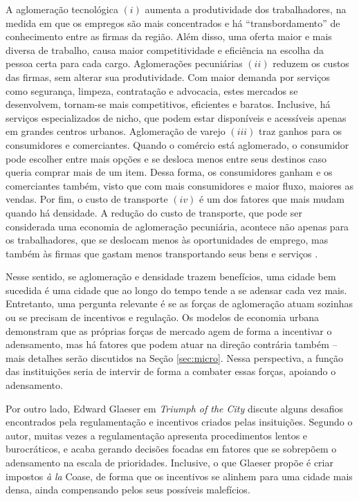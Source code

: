A aglomeração tecnológica $(i)$ aumenta a produtividade dos trabalhadores, na medida em que os empregos são mais concentrados e há ``transbordamento'' de conhecimento entre as firmas da região. Além disso, uma oferta maior e mais diversa de trabalho, causa maior competitividade e eficiência na escolha da pessoa certa para cada cargo. Aglomerações pecuniárias $(ii)$ reduzem os custos das firmas, sem alterar sua produtividade. Com maior demanda por serviços como segurança, limpeza, contratação e advocacia, estes mercados se desenvolvem, tornam-se mais competitivos, eficientes e baratos. Inclusive, há serviços especializados de nicho, que podem estar disponíveis e acessíveis apenas em grandes centros urbanos. Aglomeração de varejo $(iii)$ traz ganhos para os consumidores e comerciantes. Quando o comércio está aglomerado, o consumidor pode escolher entre mais opções e se desloca menos entre seus destinos caso queria comprar mais de um item. Dessa forma, os consumidores ganham e os comerciantes também, visto que com mais consumidores e maior fluxo, maiores as vendas. Por fim, o custo de transporte $(iv)$ é um dos fatores que mais mudam quando há densidade. A redução do custo de transporte, que pode ser considerada uma economia de aglomeração pecuniária, acontece não apenas para os trabalhadores, que se deslocam menos às oportunidades de emprego, mas também às firmas que gastam menos transportando seus bens e serviços \cite{brueckner2011lectures}.

Nesse sentido, se aglomeração e densidade trazem benefícios, uma cidade bem sucedida é uma cidade que ao longo do tempo tende a se adensar cada vez mais. Entretanto, uma pergunta relevante é se as forças de aglomeração atuam sozinhas ou se precisam de incentivos e regulação. Os modelos de economia urbana demonstram que as próprias forças de mercado agem de forma a incentivar o adensamento, mas há fatores que podem atuar na direção contrária também \cite{brueckner2011lectures} -- mais detalhes serão discutidos na Seção \ref{sec:micro}. Nessa perspectiva, a função das instituições seria de intervir de forma a combater essas forças, apoiando o adensamento. 

Por outro lado, Edward Glaeser em \textit{Triumph of the City} discute alguns desafios encontrados pela regulamentação e incentivos criados pelas insituições. Segundo o autor, muitas vezes a regulamentação apresenta procedimentos lentos e burocráticos, e acaba gerando decisões focadas em fatores que se sobrepõem o adensamento na escala de prioridades. Inclusive, o que Glaeser propõe é criar impostos \textit{à la} Coase, de forma que os incentivos se alinhem para uma cidade mais densa, ainda compensando pelos seus possíveis malefícios. 

